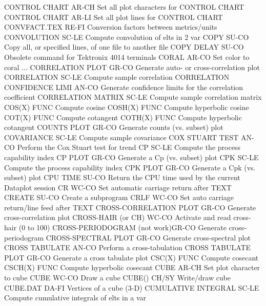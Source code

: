 CONTROL CHART               AR-CH Set all plot characters for CONTROL CHART
CONTROL CHART               AR-LI Set all plot lines for CONTROL CHART
CONVFACT.TEX                RE-FI Conversion factors between metrics/units
CONVOLUTION                 SC-LE Compute convolution of elts in 2 var
COPY                        SU-CO Copy all, or specified lines, of one file to another file
COPY DELAY                  SU-CO Obsolete command for Tektronix 4014 terminals
CORAL                       AR-CO Set color to coral
... CORRELATION PLOT        GR-CO Generate auto- or cross-correlation plot
CORRELATION                 SC-LE Compute sample correlation
CORRELATION CONFIDENCE LIMI AN-CO Generate confidence limits for the correlation coefficient
CORRELATION MATRIX          SC-LE Compute sample correlation matrix
COS(X)                      FUNC  Compute cosine
COSH(X)                     FUNC  Compute hyperbolic cosine
COT(X)                      FUNC  Compute cotangent
COTH(X)                     FUNC  Compute hyperbolic cotangent
COUNTS PLOT                 GR-CO Generate counts (vs. subset) plot
COVARIANCE                  SC-LE Compute sample covariance
COX STUART TEST             AN-CO Perform the Cox Stuart test for trend
CP                          SC-LE Compute the process capability index
CP PLOT                     GR-CO Generate a Cp (vs. subset) plot
CPK                         SC-LE Compute the process capability index
CPK PLOT                    GR-CO Generate a Cpk (vs. subset) plot
CPU TIME                    SU-CO Return the CPU time used by the current Dataplot session
CR                          WC-CO Set automatic carriage return after TEXT
CREATE                      SU-CO Create a subprogram
CRLF                        WC-CO Set auto carriage return/line feed after TEXT
CROSS-CORRELATION PLOT      GR-CO Generate cross-correlation plot
CROSS-HAIR (or CH)          WC-CO Activate and read cross-hair (0 to 100)
CROSS-PERIODOGRAM (not work)GR-CO Generate cross-periodogram
CROSS-SPECTRAL PLOT         GR-CO Generate cross-spectral plot
CROSS TABULATE              AN-CO Perform a cross-tabulation
CROSS TABULATE PLOT         GR-CO Generate a cross tabulate plot
CSC(X)                      FUNC  Compute cosecant
CSCH(X)                     FUNC  Compute hyperbolic cosecant
CUBE                        AR-CH Set plot character to cube
CUBE                        WC-CO Draw a cube
CUBE()                      CH/SY Write/draw cube
CUBE.DAT                    DA-FI Vertices of a cube (3-D)
CUMULATIVE INTEGRAL         SC-LE Compute cumulative integrals of elts in a var
